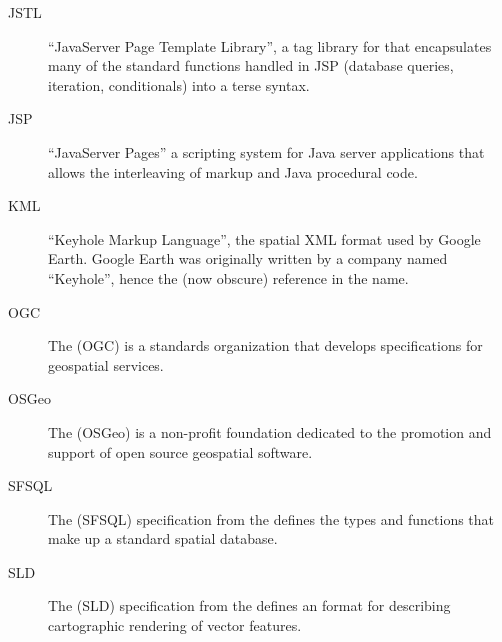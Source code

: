 \documentclass[a4paper,11pt,english]{sphinxmanual}
\begin{document}
\begin{description}
\item[{JSTL\label{\detokenize{glossary:term-jstl}}}] \leavevmode
“JavaServer Page Template Library”, a tag library for {\hyperref[\detokenize{glossary:term-jsp}]{}} that encapsulates many of the standard functions handled in JSP (database queries, iteration, conditionals) into a terse syntax.

\item[{JSP\label{\detokenize{glossary:term-jsp}}}] \leavevmode
“JavaServer Pages” a scripting system for Java server applications that allows the interleaving of markup and Java procedural code.

\item[{KML\label{\detokenize{glossary:term-kml}}}] \leavevmode
“Keyhole Markup Language”, the spatial XML format used by Google Earth. Google Earth was originally written by a company named “Keyhole”, hence the (now obscure) reference in the name.

\item[{OGC\label{\detokenize{glossary:term-ogc}}}] \leavevmode
The  (OGC) is a standards organization that develops specifications for geospatial services.

\item[{OSGeo\label{\detokenize{glossary:term-osgeo}}}] \leavevmode
The  (OSGeo) is a non-profit foundation dedicated to the promotion and support of open source geospatial software.

\item[{SFSQL\label{\detokenize{glossary:term-sfsql}}}] \leavevmode
The  (SFSQL) specification from the {\hyperref[\detokenize{glossary:term-ogc}]{}} defines the types and functions that make up a standard spatial database.

\item[{SLD\label{\detokenize{glossary:term-sld}}}] \leavevmode
The  (SLD) specification from the {\hyperref[\detokenize{glossary:term-ogc}]{}} defines an format for describing cartographic rendering of vector features.


\end{description}
\end{document}
